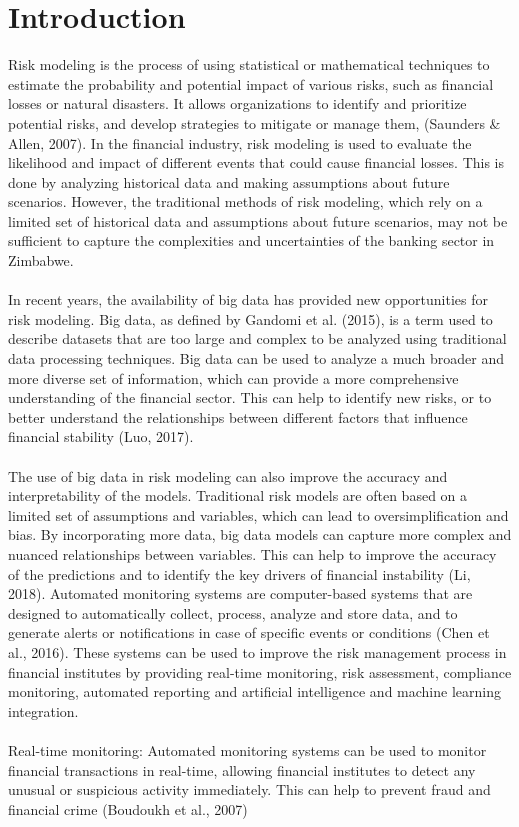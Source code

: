 \chapter{Introduction}

Risk modeling is the process of using statistical or mathematical techniques to estimate the
probability and potential impact of various risks, such as financial losses or natural disasters. It
allows organizations to identify and prioritize potential risks, and develop strategies to mitigate
or manage them, (Saunders \& Allen, 2007). In the financial industry, risk modeling is used to evaluate the
likelihood and impact of different events that could cause financial losses. This is done by
analyzing historical data and making assumptions about future scenarios. However, the
traditional methods of risk modeling, which rely on a limited set of historical data and
assumptions about future scenarios, may not be sufficient to capture the complexities and
uncertainties of the banking sector in Zimbabwe.\\ \\
In recent years, the availability of big data has provided new opportunities for risk modeling. Big
data, as defined by Gandomi et al. (2015), is a term used to describe datasets that are too large
and complex to be analyzed using traditional data processing techniques. Big data can be used to
analyze a much broader and more diverse set of information, which can provide a more
comprehensive understanding of the financial sector. This can help to identify new risks, or to
better understand the relationships between different factors that influence financial stability
(Luo, 2017).\\\\
The use of big data in risk modeling can also improve the accuracy and interpretability of the
models. Traditional risk models are often based on a limited set of assumptions and variables,
which can lead to oversimplification and bias. By incorporating more data, big data models can
capture more complex and nuanced relationships between variables. This can help to improve the
accuracy of the predictions and to identify the key drivers of financial instability (Li, 2018).
Automated monitoring systems are computer-based systems that are designed to automatically
collect, process, analyze and store data, and to generate alerts or notifications in case of specific
events or conditions (Chen et al., 2016). These systems can be used to improve the risk
management process in financial institutes by providing real-time monitoring, risk assessment,
compliance monitoring, automated reporting and artificial intelligence and machine learning
integration.\\\\
Real-time monitoring: Automated monitoring systems can be used to monitor financial
transactions in real-time, allowing financial institutes to detect any unusual or suspicious activity
immediately. This can help to prevent fraud and financial crime (Boudoukh et al., 2007)

